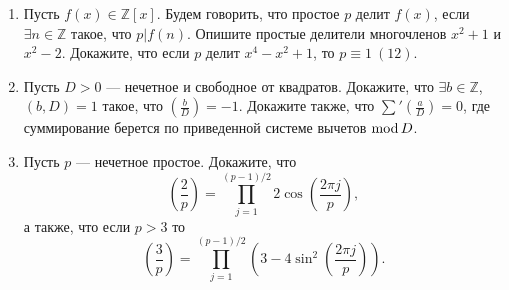 \begin{enumerate}[topsep=0pt]
    \item Пусть $f(x) \in \mathbb{Z}[x]$. Будем говорить, что простое $p$ делит $f(x)$, если $\exists n \in \mathbb{Z}$ такое, что $p|f(n)$. Опишите простые делители многочленов $x^2+1$ и $x^2-2$. Докажите, что если $p$ делит $x^4-x^2+1$, то $p \equiv 1\ (12)$. %
    \item Пусть $D>0$ --- нечетное и свободное от квадратов. Докажите, что $\exists b\in \mathbb{Z}$, $(b,D)=1$ такое, что $\left(\frac{b}{D}\right)=-1$. Докажите также, что $\sum' \left(\frac{a}{D}\right) = 0$, где суммирование берется по приведенной системе вычетов $\operatorname{mod} D$. %
    \item Пусть $p$ --- нечетное простое. Докажите, что 
    $$
    \left(\frac{2}{p}\right) = \prod_{j=1}^{(p-1)/2} 2\cos\left(\frac{2\pi j}{p}\right),
    $$
    а также, что если $p>3$ то
    $$
    \left(\frac{3}{p}\right) = \prod_{j=1}^{(p-1)/2} \left(3- 4\sin^2\left(\frac{2\pi j}{p}\right) \right).
    $$
\end{enumerate}

